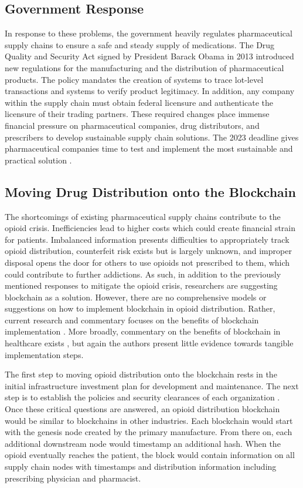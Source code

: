 \documentclass[sigconf]{acmart}
\begin{document}
\subsection{Government Response}
In response to these problems, the government heavily regulates pharmaceutical supply chains to ensure a safe and steady supply of medications. The Drug Quality and Security Act \cite{DQASA} signed by President Barack Obama in 2013 introduced new regulations for the manufacturing and the distribution of pharmaceutical products. The policy mandates the creation of systems to trace lot-level transactions and systems to verify product legitimacy. In addition, any company within the supply chain must obtain federal licensure and authenticate the licensure of their trading partners. These required changes place immense financial pressure on pharmaceutical companies, drug distributors, and prescribers to develop sustainable supply chain solutions. The 2023 deadline gives pharmaceutical companies time to test and implement the most sustainable and practical solution \cite{opsis8}.

\subsection{Moving Drug Distribution onto the Blockchain}
 The shortcomings of existing pharmaceutical supply chains contribute to the opioid crisis. Inefficiencies lead to higher costs which could create financial strain for patients. Imbalanced information presents difficulties to appropriately track opioid distribution, counterfeit risk exists but is largely unknown, and improper disposal opens the door for others to use opioids not prescribed to them, which could contribute to further addictions. As such, in addition to the previously mentioned responses to mitigate the opioid crisis, researchers are suggesting blockchain as a solution. However, there are no comprehensive models or suggestions on how to implement blockchain in opioid distribution. Rather, current research and commentary focuses on the benefits of blockchain implementation \cite{Durbin01} \cite{Galer01}. More broadly, commentary on the benefits of blockchain in healthcare exists \cite{Tsung01} \cite{Angraal01} \cite{Sharma01} \cite{Miliard01} \cite{Das01}, but again the authors present little evidence towards tangible implementation steps.

The first step to moving opioid distribution onto the blockchain rests in the initial infrastructure investment plan for development and maintenance. The next step is to establish the policies and security clearances of each organization \cite{Christidis01}. Once these critical questions are answered, an opioid distribution blockchain would be similar to blockchains in other industries. Each blockchain would start with the genesis node created by the primary manufacture. From there on, each additional downstream node would timestamp an additional hash. When the opioid eventually reaches the patient, the block would contain information on all supply chain nodes with timestamps and distribution information including prescribing physician and pharmacist. 
\end{document}

